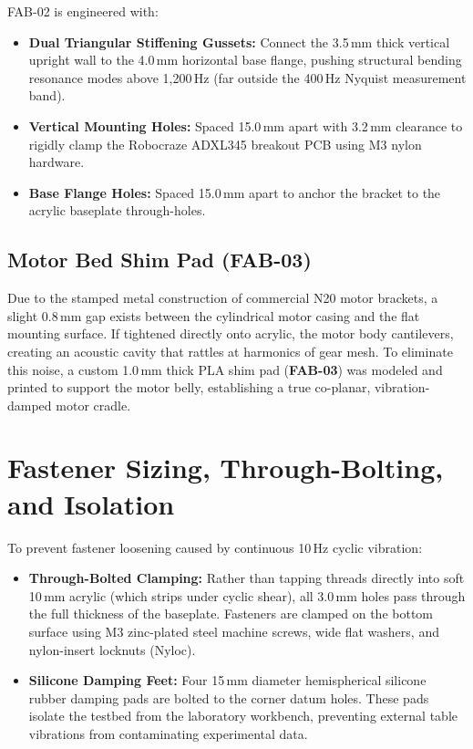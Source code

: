 FAB-02 is engineered with:
\begin{itemize}
    \item \textbf{Dual Triangular Stiffening Gussets:} Connect the 3.5\,mm thick vertical upright wall to the 4.0\,mm horizontal base flange, pushing structural bending resonance modes above 1,200\,Hz (far outside the 400\,Hz Nyquist measurement band).
    \item \textbf{Vertical Mounting Holes:} Spaced 15.0\,mm apart with 3.2\,mm clearance to rigidly clamp the Robocraze ADXL345 breakout PCB using M3 nylon hardware.
    \item \textbf{Base Flange Holes:} Spaced 15.0\,mm apart to anchor the bracket to the acrylic baseplate through-holes.
\end{itemize}

\subsection{Motor Bed Shim Pad (FAB-03)}
Due to the stamped metal construction of commercial N20 motor brackets, a slight 0.8\,mm gap exists between the cylindrical motor casing and the flat mounting surface. If tightened directly onto acrylic, the motor body cantilevers, creating an acoustic cavity that rattles at harmonics of gear mesh. To eliminate this noise, a custom 1.0\,mm thick PLA shim pad (\textbf{FAB-03}) was modeled and printed to support the motor belly, establishing a true co-planar, vibration-damped motor cradle.

\section{Fastener Sizing, Through-Bolting, and Isolation}
To prevent fastener loosening caused by continuous 10\,Hz cyclic vibration:
\begin{itemize}
    \item \textbf{Through-Bolted Clamping:} Rather than tapping threads directly into soft 10\,mm acrylic (which strips under cyclic shear), all 3.0\,mm holes pass through the full thickness of the baseplate. Fasteners are clamped on the bottom surface using M3 zinc-plated steel machine screws, wide flat washers, and nylon-insert locknuts (Nyloc).
    \item \textbf{Silicone Damping Feet:} Four 15\,mm diameter hemispherical silicone rubber damping pads are bolted to the corner datum holes. These pads isolate the testbed from the laboratory workbench, preventing external table vibrations from contaminating experimental data.
\end{itemize}


